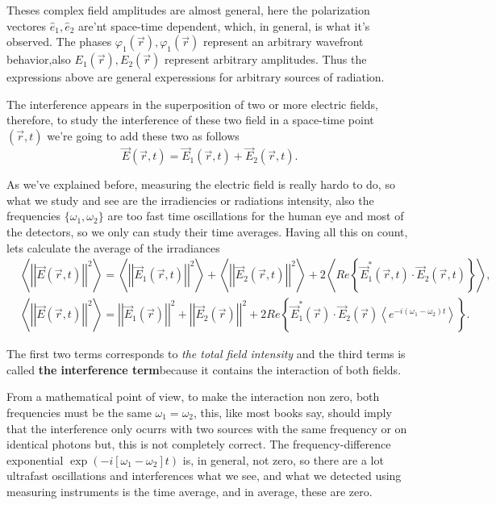     Theses complex field amplitudes are almost general, here the polarization vectores $\hat{e}_1,\hat{e}_2$ are'nt space-time dependent, which, in general, is what it's observed. The phases $\varphi_1(\vec{r}), \varphi_1(\vec{r})$ represent an arbitrary wavefront behavior,also $E_1(\vec{r}),E_2(\vec{r})$ represent arbitrary amplitudes. Thus the expressions above are general experessions for arbitrary sources of radiation. 

    The interference appears in the superposition of two or more electric fields, therefore, to study the interference of these two field in a space-time point $(\vec{r},t)$ we're going to add these two as follows
    \begin{equation}
        \vec{E}(\vec{r},t) = \vec{E}_1(\vec{r},t) + \vec{E}_2(\vec{r},t).
    \end{equation}

    As we've explained before, measuring the electric field is really hardo to do, so what we study and see are the irradiencies or radiations intensity, also the frequencies $\{\omega_1,\omega_2\}$ are too fast time oscillations for the human eye and most of the detectors, so we only can study their time averages. Having all this on count, lets calculate the average of the irradiances
    \begin{align*}
        & \left\langle \left|\left|\vec{E}(\vec{r},t) \right|\right|^2\right\rangle = \left\langle \left|\left|\vec{E}_1(\vec{r},t) \right|\right|^2\right\rangle + \left\langle \left|\left|\vec{E}_2(\vec{r},t) \right|\right|^2\right\rangle + 2\left\langle Re\left\{\vec{E}_1^*(\vec{r},t)\cdot \vec{E}_2(\vec{r},t) \right\}\right\rangle,\\
        & \left\langle \left|\left|\vec{E}(\vec{r},t) \right|\right|^2\right\rangle = \left|\left|\vec{E}_1(\vec{r})\right|\right|^2 + \left|\left|\vec{E}_2(\vec{r})\right|\right|^2 + 2 Re\left\{ \vec{E}_1^*(\vec{r})\cdot\vec{E}_2(\vec{r}) \left\langle e^{-i(\omega_1-\omega_2)t} \right\rangle \right\}.
    \end{align*}

    The first two terms corresponds to \emph{the total field intensity} and the third terms is called \textbf{the interference term}because it contains the interaction of both fields.

    From a mathematical point of view, to make the interaction non zero, both frequencies must be the same $\omega_1=\omega_2$, this, like most books say, should imply that the interference only ocurrs with two sources with the same frequency or on identical photons but, this is not completely correct. The frequency-difference exponential $\exp\left(-i \left[\omega_1 - \omega_2 \right]t\right)$ is, in general, not zero, so there are a lot ultrafast oscillations and interferences what we see, and what we detected using measuring instruments is the time average, and in average, these are zero.

